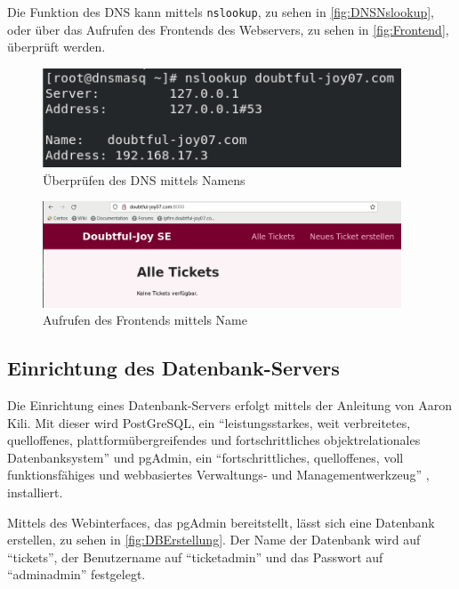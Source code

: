 \documentclass[a4paper,
    11pt,
    headings=small,
    ngerman,
    listof=totoc,
    numbers=noenddot]{scrreprt}[2021/11/13]
\begin{document}
Die Funktion des \ac{DNS} kann mittels \texttt{nslookup}, zu sehen in \vref{fig:DNSNslookup}, oder über das Aufrufen des Frontends des Webservers, zu sehen in \vref{fig:Frontend}, überprüft werden.

\begin{figure}[htbp]
  \centering
  \includegraphics[width=0.95\textwidth]{data/dns-works-nslookup.png}
  \caption{Überprüfen des DNS mittels Namens}
  \label{fig:DNSNslookup}
\end{figure}

\begin{figure}[htbp]
  \centering
  \includegraphics[width=0.95\textwidth]{data/dns-names-working.png}
  \caption{Aufrufen des Frontends mittels Name}
  \label{fig:Frontend}
\end{figure}


\subsection{Einrichtung des Datenbank-Servers}

Die Einrichtung eines Datenbank-Servers erfolgt mittels der Anleitung von Aaron Kili. \autocite{tecmint:PostgreSQLAndpgAdmin} Mit dieser wird PostGreSQL, ein \enquote{leistungsstarkes, weit verbreitetes, quelloffenes, plattformübergreifendes und fortschrittliches objektrelationales Datenbanksystem} \autocite{tecmint:PostgreSQLAndpgAdmin} und pgAdmin, ein \enquote{fortschrittliches, quelloffenes, voll funktionsfähiges und webbasiertes Verwaltungs- und Managementwerkzeug} \autocite{tecmint:PostgreSQLAndpgAdmin}, installiert.

Mittels des Webinterfaces, das pgAdmin bereitstellt, lässt sich eine Datenbank erstellen, zu sehen in \vref{fig:DBErstellung}. Der Name der Datenbank wird auf \enquote{tickets}, der Benutzername auf \enquote{ticketadmin} und das Passwort auf \enquote{adminadmin} festgelegt.
\end{document}
